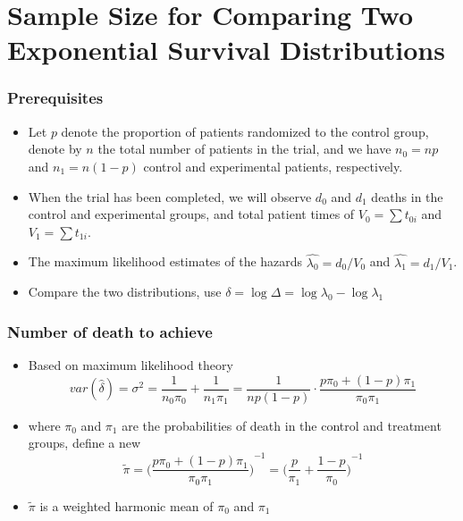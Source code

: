 \documentclass{beamer}
\begin{document}
\section{Sample Size for Comparing Two Exponential Survival Distributions}
\begin{frame}
\frametitle{Prerequisites}
\begin{itemize}
\item Let $p$ denote the proportion of patients randomized to the control group, denote by $n$ the total number of patients in the trial, and we have $n_0 = np$ and $n_1 = n(1-p)$ control and experimental patients, respectively.
\item When the trial has been completed, we will observe $d_0$ and $d_1$ deaths in the control and experimental groups, and total patient times of $V_0 = \sum t_{0i}$ and $V_1 = \sum t_{1i}$.
\item The maximum likelihood estimates of the hazards $\hat{\lambda_0} = d_0/V_0$ and $\hat{\lambda_1} = d_1/V_1$. 
\item Compare the two distributions, use $\delta = \log \Delta = \log \lambda_0 - \log \lambda_1$
\end{itemize}
\end{frame}

\pagebreak
\begin{frame}
\frametitle{Number of death to achieve}
\begin{itemize}
\item Based on maximum likelihood theory
\begin{equation}
var(\hat{\delta}) = \sigma^2 = \frac{1}{n_0 \pi_0} +\frac{1}{n_1 \pi_1} = \frac{1}{np(1-p)}\cdot \frac{p\pi_0 + (1-p)\pi_1}{\pi_0 \pi_1}
\end{equation}
\item where $\pi_0$ and $\pi_1$ are the probabilities of death in the control and treatment groups, define a new
\begin{equation}
\tilde{\pi} = {\bigg( \frac{p\pi_0 + (1-p)\pi_1}{\pi_0\pi_1} \bigg) }^{-1} = {\bigg( \frac{p}{\pi_1} + \frac{1-p}{\pi_0} \bigg)}^{-1}
\end{equation}
\item $\tilde{\pi}$ is a weighted harmonic mean of $\pi_0$ and $\pi_1$
\end{itemize}
\end{frame}
\end{document}

